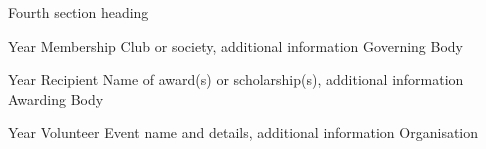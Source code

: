 \begin{tmrsection}{Fourth section heading}


\tmrcolumnentry
    {Year}
  	{Membership}
    {Club or society, additional information}
    {Governing Body}

\tmrcolumnentry
  	{Year}
  	{Recipient}
  	{Name of award(s) or scholarship(s), additional information}
  	{Awarding Body}


\tmrcolumnentry
    {Year}
    {Volunteer}
    {Event name and details, additional information}
    {Organisation}

\end{tmrsection}